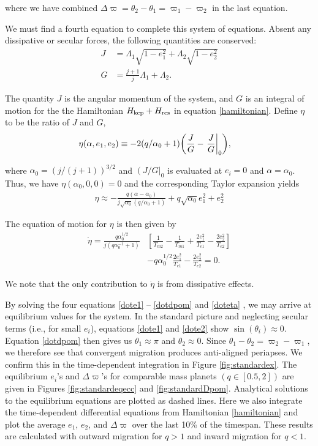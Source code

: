 \documentclass{mnras}
\DeclarePairedDelimiter{\p}{(}{)}
\begin{document}
where we have combined \(\Delta\varpi = \theta_2 - \theta_1 =
\varpi_1-\varpi_2\) in the last equation.

We must find a fourth equation to complete this system of equations.
Absent any dissipative or secular forces, the following quantities are
conserved:
\begin{align}
  J &= \Lambda_1\sqrt{1-e_1^2} + \Lambda_2\sqrt{1-e_2^2}\\
  G &= \frac{j+1}{j} \Lambda_1 + \Lambda_2.
\end{align}

The quantity \(J\) is the angular momentum of the system, and \(G\) is an
integral of motion for the the Hamiltonian \(H_{\rm kep}+H_{\rm res}\)
in equation \eqref{hamiltonian}.  Define \(\eta\) to be the ratio of \(J\) and \(G\),
\begin{align}
  \eta(\alpha, e_1, e_2) &\equiv - 2(q/\alpha_0+1)\p*{\frac{J}{G}-\left.\frac{J}{G}\right|_{0}},
\end{align}

where \(\alpha_0 = (j/(j+1))^{3/2}\) and \(\left(J/G\right|_{0}\) is
evaluated at \(e_i=0\) and \(\alpha=\alpha_0\).
Thus, we have \(\eta(\alpha_0, 0, 0)=0\) and the corresponding Taylor expansion yields
\begin{align}
  \eta \approx -\frac{q(\alpha-\alpha_0)}{j\sqrt{\alpha_0}(q/\alpha_0+1)} + q\sqrt{\alpha_0}e_1^2 + e_2^2
\end{align}

The equation of motion for \(\eta\) is then given by
\begin{align}
\label{doteta}
  \dot\eta = \frac{q\alpha_0^{1/2}}{j(q\alpha_0^{-1}+1)}&\left[ \frac{1}{T_{m2}} - \frac{1}{T_{m1}}
      + \frac{2e_1^2}{T_{e1}}- \frac{2e_2^2}{T_{e2}} \right] \nonumber\\
    &- q\alpha_0^{1/2}\frac{2e_1^2}{T_{e1}} - \frac{2e_2^2}{T_{e2}}=0.
\end{align}

We note that the only contribution to \(\dot{\eta}\) is from dissipative effects.

By solving the four equations \eqref{dote1} -- \eqref{dotdpom} and
\eqref{doteta} , we may arrive at equilibrium values for the system.  In
the standard picture and neglecting secular terms (i.e., for small
\(e_i\)), equations \eqref{dote1} and \eqref{dote2} show
\(\sin(\theta_i)\approx 0\).  Equation \eqref{dotdpom} then gives us
\(\theta_1\approx \pi\) and \(\theta_2\approx 0\).  Since
\(\theta_1-\theta_2 = \varpi_2-\varpi_1\), we therefore see that
convergent migration produces anti-aligned periapses.  We confirm this
in the time-dependent integration in Figure \ref{fig:standardex}.
The equilibrium \(e_i\)'s and \(\Delta\varpi\)'s for comparable mass
planets \((q\in[0.5,2])\) are given in Figures \ref{fig:standardeqecc} and
\ref{fig:standardDpom}.  Analytical solutions to the equilibrium
equations are plotted as dashed lines.  Here we also integrate the
time-dependent differential equations from Hamiltonian
\eqref{hamiltonian} and plot the average \(e_1\), \(e_2\), and
\(\Delta\varpi\) over the last 10\% of the timespan.  These results are
calculated with outward migration for \(q>1\) and inward migration for
\(q<1\).
\end{document}
